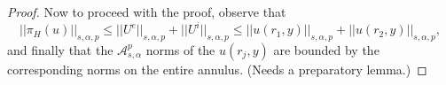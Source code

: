 \documentclass[12pt]{article}
\newtheorem{prop}[thm]{Proposition}
\newcommand{\calA}{{\mathcal A}}
\begin{document}
\begin{proof}
    


Now to proceed with the proof, observe that
\[
||\pi_H(u)||_{s,\alpha,p} \leq ||U^e||_{s,\alpha,p} + ||U^i||_{s,\alpha,p} \leq  ||u(r_1,y)||_{s,\alpha,p} + ||u(r_2, y)||_{s,\alpha,p},
\]
and finally that the $\calA^p_{s,\alpha}$ norms of the $u(r_j,y)$ are bounded by the corresponding
norms on the entire annulus.  (Needs a preparatory lemma.) 


\end{proof}
\end{document}
